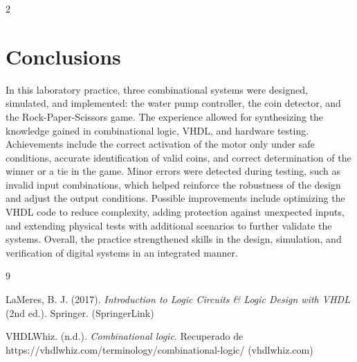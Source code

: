 \documentclass{article}
\begin{document}
\begin{multicols}{2}
\section{Conclusions}\label{Conclusion}
In this laboratory practice, three combinational systems were designed, simulated, and implemented: the water pump controller, the coin detector, and the Rock-Paper-Scissors game. The experience allowed for synthesizing the knowledge gained in combinational logic, VHDL, and hardware testing. Achievements include the correct activation of the motor only under safe conditions, accurate identification of valid coins, and correct determination of the winner or a tie in the game. Minor errors were detected during testing, such as invalid input combinations, which helped reinforce the robustness of the design and adjust the output conditions. Possible improvements include optimizing the VHDL code to reduce complexity, adding protection against unexpected inputs, and extending physical tests with additional scenarios to further validate the systems. Overall, the practice strengthened skills in the design, simulation, and verification of digital systems in an integrated manner. 

\begin{thebibliography}{9}

LaMeres, B. J. (2017). \textit{Introduction to Logic Circuits \& Logic Design with VHDL} (2nd ed.). Springer. (SpringerLink) 

VHDLWhiz. (n.d.). \textit{Combinational logic}. Recuperado de https://vhdlwhiz.com/terminology/combinational-logic/ (vhdlwhiz.com) 

\end{thebibliography}
\end{multicols}
\end{document}
